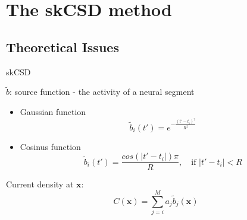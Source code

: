 \documentclass[11pt,a4paper,titlepage]{beamer}
\begin{document}


\section{The skCSD method}
\subsection{Theoretical Issues}
\begin{frame}{skCSD}


$\tilde{b}$:  source function - the activity of a neural segment

\begin{itemize}
\item Gaussian function
\begin{equation}
\tilde{b}_i (t') = e^{- \frac{(t' - t_i)^2}{R^2}}
\end{equation}

\item Cosinus function
\begin{equation}
\tilde{b}_i (t') =\frac{cos(|t' - t_i|) \pi}{R} ,\quad \text{if $|t' - t_i|<R$}
\end{equation}

\end{itemize} 

Current density at $\textbf{x}$:
\begin{equation}
C (\textbf{x})= \sum_{j=i}^M a_j \tilde{b}_j(\textbf{x})
\end{equation}






\end{frame}
\end{document}
